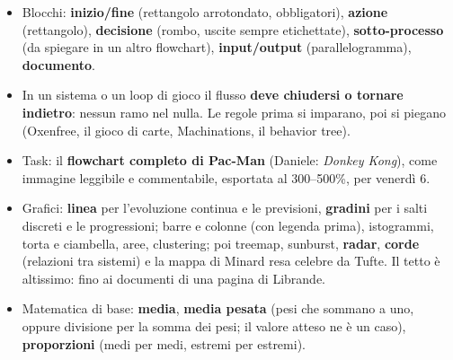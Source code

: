 \begin{itemize}
  \item Blocchi: \textbf{inizio/fine} (rettangolo arrotondato, obbligatori),
        \textbf{azione} (rettangolo), \textbf{decisione} (rombo, uscite
        sempre etichettate), \textbf{sotto-processo} (da spiegare in un altro
        flowchart), \textbf{input/output} (parallelogramma),
        \textbf{documento}.
  \item In un sistema o un loop di gioco il flusso \textbf{deve chiudersi o
        tornare indietro}: nessun ramo nel nulla. Le regole prima si
        imparano, poi si piegano (Oxenfree, il gioco di carte, Machinations,
        il behavior tree).
  \item Task: il \textbf{flowchart completo di Pac-Man} (Daniele:
        \emph{Donkey Kong}), come immagine leggibile e commentabile,
        esportata al 300--500\%, per venerdì 6.
  \item Grafici: \textbf{linea} per l'evoluzione continua e le previsioni,
        \textbf{gradini} per i salti discreti e le progressioni; barre e
        colonne (con legenda prima), istogrammi, torta e ciambella, aree,
        clustering; poi treemap, sunburst, \textbf{radar}, \textbf{corde}
        (relazioni tra sistemi) e la mappa di Minard resa celebre da Tufte.
        Il tetto è altissimo: fino ai documenti di una pagina di Librande.
  \item Matematica di base: \textbf{media}, \textbf{media pesata} (pesi che
        sommano a uno, oppure divisione per la somma dei pesi; il valore
        atteso ne è un caso), \textbf{proporzioni} (medi per medi, estremi
        per estremi).
\end{itemize}
